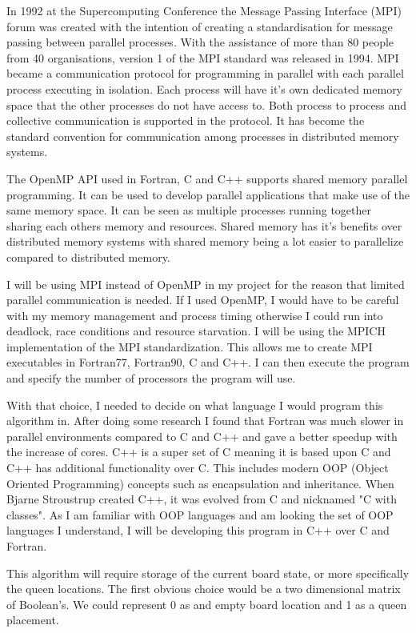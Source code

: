 In 1992 at the Supercomputing Conference the Message Passing Interface (MPI) forum was created with the intention of creating a standardisation for message passing between parallel processes\cite{gropp1996high}. With the assistance of more than 80 people from 40 organisations, version 1 of the MPI standard was released in 1994\cite{snir1998mpi}. MPI became a communication protocol for programming in parallel with each parallel process executing in isolation. Each process will have it's own dedicated memory space that the other processes do not have access to. Both process to process and collective communication is supported in the protocol. It has become the standard convention for communication among processes in distributed memory systems. 

The OpenMP API used in Fortran, C and C++ supports shared memory parallel programming. It can be used to develop parallel applications that make use of the same memory space. It can be seen as multiple processes running together sharing each others memory and resources\cite{chandra2001parallel}. Shared memory has it's benefits over distributed memory systems with shared memory being a lot easier to parallelize compared to distributed memory.    

I will be using MPI instead of OpenMP in my project for the reason that limited parallel communication is needed. If I used OpenMP, I would have to be careful with my memory management and process timing otherwise I could run into deadlock, race conditions and resource starvation\cite{ben2006principles}. I will be using the MPICH implementation of the MPI standardization\cite{gropp1996user}. This allows me to create MPI executables in Fortran77, Fortran90, C and C++. I can then execute the program and specify the number of processors the program will use. 

With that choice, I needed to decide on what language I would program this algorithm in. After doing some research I found that Fortran was much slower in parallel environments compared to C and C++ and gave a better speedup with the increase of cores\cite{young2016openmp}\cite{cary1997comparison}. C++ is a super set of C meaning it is based upon C and C++ has additional functionality over C. This includes modern OOP (Object Oriented Programming) concepts such as encapsulation and inheritance. When Bjarne Stroustrup created C++, it was evolved from C and nicknamed "C with classes"\cite{stroustrup1996history}. As I am familiar with OOP languages and am looking the set of OOP languages I understand, I will be developing this program in C++ over C and Fortran.  

This algorithm will require storage of the current board state, or more specifically the queen locations. The first obvious choice would be a two dimensional matrix of Boolean's. We could represent 0 as and empty board location and 1 as a queen placement.  


